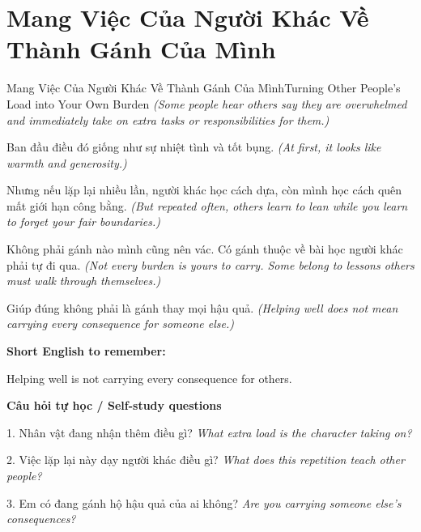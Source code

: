 \section{Mang Việc Của Người Khác Về Thành Gánh Của Mình}
\begin{truyen}{Mang Việc Của Người Khác Về Thành Gánh Của Mình}{Turning Other People's Load into Your Own Burden}
\textit{(Some people hear others say they are overwhelmed and immediately take on extra tasks or responsibilities for them.)}

Ban đầu điều đó giống như sự nhiệt tình và tốt bụng.
\textit{(At first, it looks like warmth and generosity.)}

Nhưng nếu lặp lại nhiều lần, người khác học cách dựa, còn mình học cách quên mất giới hạn công bằng.
\textit{(But repeated often, others learn to lean while you learn to forget your fair boundaries.)}

Không phải gánh nào mình cũng nên vác. Có gánh thuộc về bài học người khác phải tự đi qua.
\textit{(Not every burden is yours to carry. Some belong to lessons others must walk through themselves.)}

\end{truyen}

\begin{baihoc}
Giúp đúng không phải là gánh thay mọi hậu quả.
\textit{(Helping well does not mean carrying every consequence for someone else.)}
\end{baihoc}

\begin{ghinhoanh}
\textbf{Short English to remember:}

Helping well is not carrying every consequence for others.

\end{ghinhoanh}

\begin{tuhocnhanh}
\textbf{Câu hỏi tự học / Self-study questions}

1. Nhân vật đang nhận thêm điều gì? \textit{What extra load is the character taking on?}

2. Việc lặp lại này dạy người khác điều gì? \textit{What does this repetition teach other people?}

3. Em có đang gánh hộ hậu quả của ai không? \textit{Are you carrying someone else's consequences?}
\end{tuhocnhanh}
\ngancach

